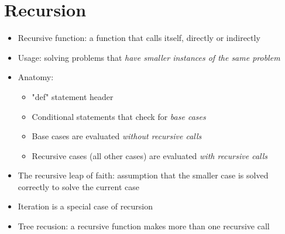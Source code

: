 \section{Recursion}
\begin{itemize}
    \item Recursive function: a function that calls itself, directly or indirectly
    \item Usage: solving problems that \emph{have smaller instances of the same problem}
    \item Anatomy:
    \begin{itemize}
        \item "def" statement header
        \item Conditional statements that check for \emph{base cases}
        \item Base cases are evaluated \emph{without recursive calls}
        \item Recursive cases (all other cases) are evaluated \emph{with recursive calls}
    \end{itemize}
    \item The recursive leap of faith: assumption that the smaller case is solved correctly to solve the current case
    \item Iteration is a special case of recursion
    \item Tree recusion: a recursive function makes more than one recursive call
\end{itemize}